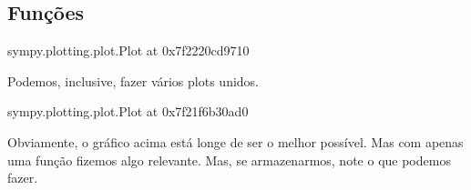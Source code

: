 \documentclass[letterpaper,10pt,english]{jupyterBook}
\begin{document}
\subsection{Funções}
\label{\detokenize{chapters/5:funcoes}}
\begin{sphinxVerbatim}[commandchars=\\\{\}]
\end{sphinxVerbatim}

\noindent{}

\begin{sphinxVerbatim}[commandchars=\\\{\}]
\PYGZlt{}sympy.plotting.plot.Plot at 0x7f2220cd9710\PYGZgt{}
\end{sphinxVerbatim}

\sphinxAtStartPar
Podemos, inclusive, fazer vários plots unidos.

\begin{sphinxVerbatim}[commandchars=\\\{\}]
 
\end{sphinxVerbatim}

\noindent{}

\begin{sphinxVerbatim}[commandchars=\\\{\}]
\PYGZlt{}sympy.plotting.plot.Plot at 0x7f21f6b30ad0\PYGZgt{}
\end{sphinxVerbatim}

\sphinxAtStartPar
Obviamente, o gráfico acima está longe de ser o melhor possível. Mas com apenas uma função fizemos algo relevante. Mas, se armazenarmos, note o que podemos fazer.

\begin{sphinxVerbatim}[commandchars=\\\{\}]
     
 
\end{sphinxVerbatim}

\noindent{}
\end{document}
